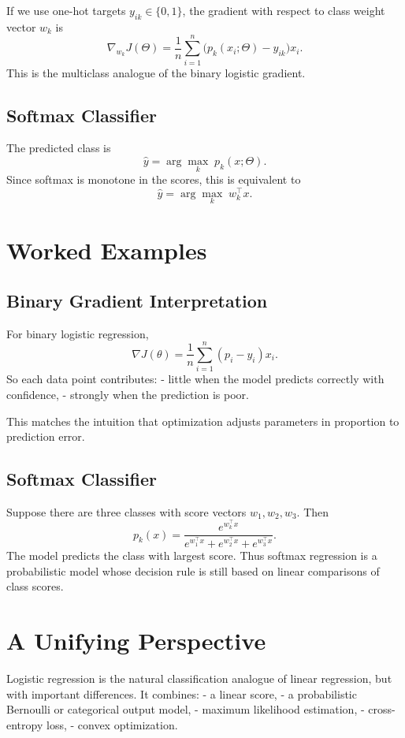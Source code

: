 If we use one-hot targets $y_{ik}\in\{0,1\}$, the gradient with respect to class weight vector $w_k$ is
\[
\nabla_{w_k} J(\Theta)
=
\frac1n\sum_{i=1}^n \big(p_k(x_i;\Theta)-y_{ik}\big)x_i.
\]
This is the multiclass analogue of the binary logistic gradient.

\subsection{Softmax Classifier}

The predicted class is
\[
\hat y = \arg\max_{k} \; p_k(x;\Theta).
\]
Since softmax is monotone in the scores, this is equivalent to
\[
\hat y=\arg\max_k \; w_k^\top x.
\]

\section{Worked Examples}

\subsection{Binary Gradient Interpretation}

For binary logistic regression,
\[
\nabla J(\theta)=\frac1n\sum_{i=1}^n (p_i-y_i)x_i.
\]
So each data point contributes:
- little when the model predicts correctly with confidence,
- strongly when the prediction is poor.

This matches the intuition that optimization adjusts parameters in proportion to prediction error.

\subsection{Softmax Classifier}

Suppose there are three classes with score vectors $w_1,w_2,w_3$. Then
\[
p_k(x)=\frac{e^{w_k^\top x}}{e^{w_1^\top x}+e^{w_2^\top x}+e^{w_3^\top x}}.
\]
The model predicts the class with largest score. Thus softmax regression is a probabilistic model whose decision rule is still based on linear comparisons of class scores.

\section{A Unifying Perspective}

Logistic regression is the natural classification analogue of linear regression, but with important differences. It combines:
- a linear score,
- a probabilistic Bernoulli or categorical output model,
- maximum likelihood estimation,
- cross-entropy loss,
- convex optimization.

